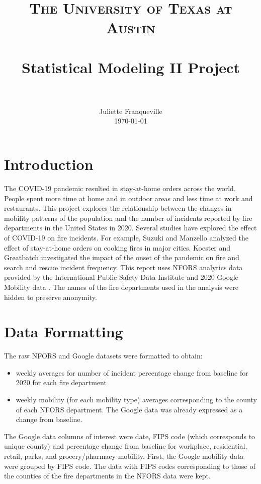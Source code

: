 \documentclass[paper=a4, fontsize=11pt]{scrartcl}
\title{
		\usefont{OT1}{bch}{b}{n}
		\normalfont \normalsize \textsc{The University of Texas at Austin} \\ [25pt]
		\horrule{0.5pt} \\[0.4cm]
		\huge Statistical Modeling II Project \\
		\horrule{2pt} \\[0.5cm]
}
\author{
		\normalfont 								\normalsize
        Juliette Franqueville\\[-3pt]		\normalsize
        \today
}
\date{}
\begin{document}
\maketitle
\newpage
\section{Introduction}

The COVID-19 pandemic resulted in stay-at-home orders across the world. People spent more time at home and in outdoor areas and less time at work and restaurants. This project explores the relationship between the changes in mobility patterns of the population and the number of incidents reported by fire departments in the United States in 2020. Several studies have  explored the effect of COVID-19 on fire incidents. For example, Suzuki and Manzello \cite{fire_paper} analyzed the effect of stay-at-home orders on cooking fires in major cities. Koester and Greatbatch \cite{koester2020comparing} investigated the impact of the onset of the pandemic on fire and search and rescue incident frequency. This report uses NFORS \cite{nfors} analytics data provided by the International Public Safety Data Institute and 2020 Google Mobility data \cite{google}. The names of the fire departments used in the analysis were hidden to preserve  anonymity. 

\section{Data Formatting}
The raw NFORS and Google datasets were formatted to obtain:
\begin{itemize}[noitemsep]
    \item weekly averages for number of incident percentage change from baseline for 2020 for each fire department
    \item  weekly mobility (for each mobility type) averages corresponding to the county of each NFORS department. The Google data was already expressed as a change from baseline.
\end{itemize}




The Google data columns of interest were date,  FIPS code (which corresponds to unique county) and percentage change from baseline for workplace, residential, retail, parks, and grocery/pharmacy mobility. First, the Google mobility data were grouped by FIPS code.  The data with FIPS codes corresponding to those of the counties of the fire departments in the NFORS data were kept.\\
\end{document}

